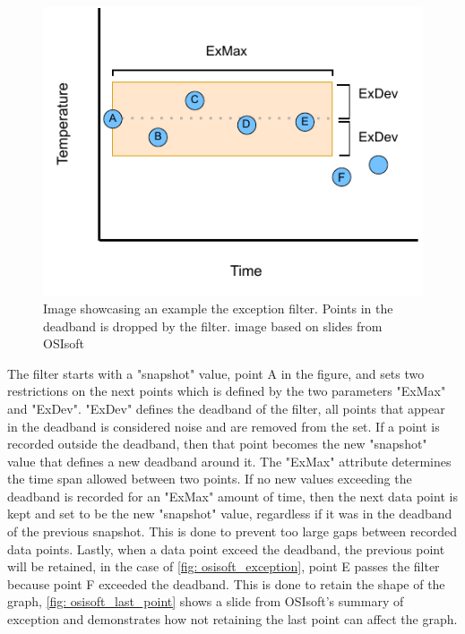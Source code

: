 \documentclass[main.tex]{subfiles}
\begin{document}
\begin{figure}[!ht]
    \centering
    \includegraphics[scale=1.3]{images/exception_process.pdf}
    \caption{Image showcasing an example the exception filter. Points in the deadband is dropped by the filter. image based on slides from OSIsoft\cite{osisoft_exception}}
    \label{fig: osisoft_exception}
\end{figure}
\FloatBarrier 
 
The filter starts with a "snapshot" value, point A in the figure, and sets two restrictions on the next points which is defined by the two parameters "ExMax" and "ExDev". "ExDev" defines the deadband of the filter, all points that appear in the deadband is considered noise and are removed from the set. If a point is recorded outside the deadband, then that point becomes the new "snapshot" value that defines a new deadband around it. The "ExMax" attribute determines the time span allowed between two points. If no new values exceeding the deadband is recorded for an "ExMax" amount of time, then the next data point is kept and set to be the new "snapshot" value, regardless if it was in the deadband of the previous snapshot. This is done to prevent too large gaps between recorded data points. Lastly, when a data point exceed the deadband, the previous point will be retained, in the case of \autoref{fig: osisoft_exception}, point E passes the filter because point F exceeded the deadband. This is done to retain the shape of the graph, \autoref{fig: osisoft_last_point} shows a slide from OSIsoft's summary of exception and demonstrates how not retaining the last point can affect the graph.
\end{document}
